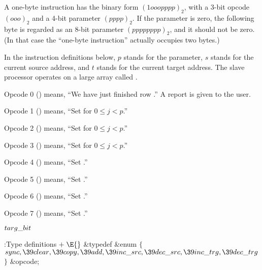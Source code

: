 A one-byte instruction has the binary form $(1ooopppp)_2$, with a 3-bit
opcode $(ooo)_2$ and a 4-bit parameter $(pppp)_2$. If the parameter is zero,
the following byte is regarded as an 8-bit parameter $(pppppppp)_2$, and
it should not be zero. (In that case the ``one-byte instruction'' actually
occupies two bytes.)

In the instruction definitions below, $p$ stands for the parameter,
$s$ stands for the current source address, and $t$ stands for the
current target address. The slave processor operates on a large
array called .

Opcode 0 () means, ``We have just finished row .'' A
report
is given to the user.

Opcode 1 () means, ``Set  for $0%
\le j< p$.''

Opcode 2 () means, ``Set  for $0\le j<p$.''

Opcode 3 () means, ``Set  for $0\le j<p$.''

Opcode 4 () means, ``Set .''

Opcode 5 () means, ``Set .''

Opcode 6 () means, ``Set .''

Opcode 7 () means, ``Set .''

\Y\B\4\D$\\{targ\_bit}$ \5
\par
\Y\B\4:Type definitions\X${}\mathrel+\E{}$\6
\&{typedef} \&{enum} ${}\{{}$\1\6
${}\\{sync},\39\\{clear},\39\\{copy},\39\\{add},\39\\{inc\_src},\39\\{dec%
\_src},\39\\{inc\_trg},\39\\{dec\_trg}{}$\2\6
${}\}{}$ \&{opcode};\par
\fi

